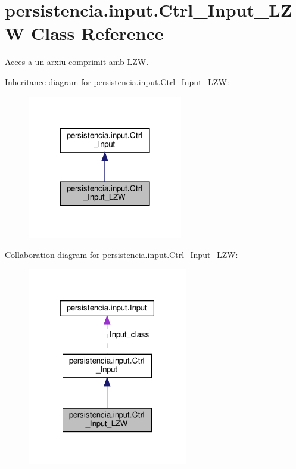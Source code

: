 \hypertarget{classpersistencia_1_1input_1_1Ctrl__Input__LZW}{}\section{persistencia.\+input.\+Ctrl\+\_\+\+Input\+\_\+\+L\+ZW Class Reference}
\label{classpersistencia_1_1input_1_1Ctrl__Input__LZW}


Acces a un arxiu comprimit amb L\+ZW.  




Inheritance diagram for persistencia.\+input.\+Ctrl\+\_\+\+Input\+\_\+\+L\+ZW\+:
\nopagebreak
\begin{figure}[H]
\begin{center}
\leavevmode
\includegraphics[width=192pt]{classpersistencia_1_1input_1_1Ctrl__Input__LZW__inherit__graph}
\end{center}
\end{figure}


Collaboration diagram for persistencia.\+input.\+Ctrl\+\_\+\+Input\+\_\+\+L\+ZW\+:
\nopagebreak
\begin{figure}[H]
\begin{center}
\leavevmode
\includegraphics[width=198pt]{classpersistencia_1_1input_1_1Ctrl__Input__LZW__coll__graph}
\end{center}
\end{figure}
